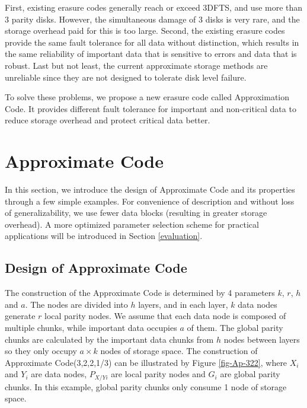 \documentclass[sigconf]{acmart}
\begin{document}
First, existing erasure codes generally reach or exceed 3DFTS, and use more than 3 parity disks. However, the simultaneous damage of 3 disks is very rare, and the storage overhead paid for this is too large. Second, the existing erasure codes provide the same fault tolerance for all data without distinction, which results in the same reliability of important data that is sensitive to errors and data that is robust. Last but not least, the current approximate storage methods are unreliable since they are not designed to tolerate disk level failure.

To solve these problems, we propose a new erasure code called Approximation Code. It provides different fault tolerance for important and non-critical data to reduce storage overhead and protect critical data better.

\section{Approximate Code}\label{ApCode}
In this section, we introduce the design of Approximate Code and its properties through a few simple examples. For convenience of description and without loss of generalizability, we use fewer data blocks (resulting in greater storage overhead). A more optimized parameter selection scheme for practical applications will be introduced in Section \ref{evaluation}.
 
\subsection{Design of Approximate Code}
The construction of the Approximate Code is determined by 4 parameters $k$, $r$, $h$ and $a$. 
The nodes are divided into $h$ layers, and in each layer, $k$ data nodes generate $r$ local parity nodes. 
We assume that each data node is composed of multiple chunks, while important data occupies $a$ of them.
The global parity chunks are calculated by the important data chunks from $h$ nodes between layers so they only occupy $a \times k$ nodes of storage space.
The construction of Approximate Code(3,2,2,1/3) can be illustrated by Figure \ref{fig-Ap-322}, where $X_i$ and $Y_i$ are data nodes, $P_{X/Yi}$ are local parity nodes and $G_i$ are global parity chunks. In this example, global parity chunks only consume 1 node of storage space.
\end{document}
